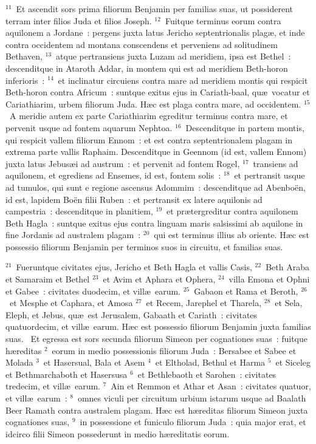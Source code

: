 ${}^{11}$~Et ascendit sors prima filiorum Benjamin per familias suas, ut possiderent terram inter filios Juda et filios Joseph.
${}^{12}$~Fuitque terminus eorum contra aquilonem a Jordane~: pergens juxta latus Jericho septentrionalis plag\ae , et inde contra occidentem ad montana conscendens et perveniens ad solitudinem Bethaven,
${}^{13}$~atque pertransiens juxta Luzam ad meridiem, ipsa est Bethel~: descenditque in Ataroth Addar, in montem qui est ad meridiem Beth-horon inferioris~:
${}^{14}$~et inclinatur circuiens contra mare ad meridiem montis qui respicit Beth-horon contra Africum~: suntque exitus ejus in Cariath-baal, qu\ae\ vocatur et Cariathiarim, urbem filiorum Juda. H\ae c est plaga contra mare, ad occidentem.
${}^{15}$~A meridie autem ex parte Cariathiarim egreditur terminus contra mare, et pervenit usque ad fontem aquarum Nephtoa.
${}^{16}$~Descenditque in partem montis, qui respicit vallem filiorum Ennom~: et est contra septentrionalem plagam in extrema parte vallis Raphaim. Descenditque in Geennom (id est, vallem Ennom) juxta latus Jebus\ae i ad austrum~: et pervenit ad fontem Rogel,
${}^{17}$~transiens ad aquilonem, et egrediens ad Ensemes, id est, fontem solis~:
${}^{18}$~et pertransit usque ad tumulos, qui sunt e regione ascensus Adommim~: descenditque ad Abenbo\"en, id est, lapidem Bo\"en filii Ruben~: et pertransit ex latere aquilonis ad campestria~: descenditque in planitiem,
${}^{19}$~et pr\ae tergreditur contra aquilonem Beth Hagla~: suntque exitus ejus contra linguam maris salsissimi ab aquilone in fine Jordanis ad australem plagam~:
${}^{20}$~qui est terminus illius ab oriente. H\ae c est possessio filiorum Benjamin per terminos suos in circuitu, et familias suas.


${}^{21}$~Fueruntque civitates ejus, Jericho et Beth Hagla et vallis Casis,
${}^{22}$~Beth Araba et Samaraim et Bethel
${}^{23}$~et Avim et Aphara et Ophera,
${}^{24}$~villa Emona et Ophni et Gabee~: civitates duodecim, et vill\ae\ earum.
${}^{25}$~Gabaon et Rama et Beroth,
${}^{26}$~et Mesphe et Caphara, et Amosa
${}^{27}$~et Recem, Jarephel et Tharela,
${}^{28}$~et Sela, Eleph, et Jebus, qu\ae\ est Jerusalem, Gabaath et Cariath~: civitates quatuordecim, et vill\ae\ earum. H\ae c est possessio filiorum Benjamin juxta familias suas.
~\lettrine[lines=10,image=true,loversize=0.05,lraise=-0.03]{E}{}t egressa est sors secunda filiorum Simeon per cognationes suas~: fuitque h\ae reditas
${}^{2}$~eorum in medio possessionis filiorum Juda~: Bersabee et Sabee et Molada
${}^{3}$~et Hasersual, Bala et Asem
${}^{4}$~et Eltholad, Bethul et Harma
${}^{5}$~et Siceleg et Bethmarchaboth et Hasersusa
${}^{6}$~et Bethlebaoth et Sarohen~: civitates tredecim, et vill\ae\ earum.
${}^{7}$~Ain et Remmon et Athar et Asan~: civitates quatuor, et vill\ae\ earum~:
${}^{8}$~omnes viculi per circuitum urbium istarum usque ad Baalath Beer Ramath contra australem plagam. H\ae c est h\ae reditas filiorum Simeon juxta cognationes suas,
${}^{9}$~in possessione et funiculo filiorum Juda~: quia major erat, et idcirco filii Simeon possederunt in medio h\ae reditatis eorum.



